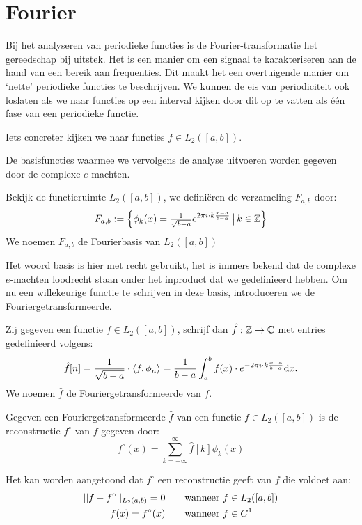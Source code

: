 \chapter{Fourier}
\label{fourierH}

Bij het analyseren van periodieke functies is de Fourier-transformatie het gereedschap bij uitstek.
Het is een manier om een signaal te karakteriseren aan de hand van een bereik aan frequenties.
Dit maakt het een overtuigende manier om `nette' periodieke functies te beschrijven.
We kunnen de eis van periodiciteit ook loslaten als we naar functies op een interval kijken door dit op te vatten
als \'e\'en fase van een periodieke functie.

Iets concreter kijken we naar functies $f\in L_2([a,b])$.


De basisfuncties waarmee we vervolgens de analyse uitvoeren worden gegeven door de complexe $e$-machten.
\begin{definitie}[Fourierbasis] Bekijk de functieruimte $L_2([a,b])$, we defini\"eren de verzameling $F_{a,b}$ 
door:
\[
  F_{a,b} := \left\{ \phi_k(x) = \tfrac{1}{\sqrt{b-a}} e^{{2\pi i} \cdot k \frac{x-a}{b-a}} \,\big|\, k \in \mathbb{Z} \right\}
\]
We noemen $F_{a,b}$ de Fourierbasis van $L_2([a,b])$
\end{definitie}
Het woord basis is hier met recht gebruikt, het is immers bekend dat de complexe $e$-machten loodrecht staan onder
het inproduct dat we gedefinieerd hebben. Om nu een willekeurige functie te schrijven in deze basis, introduceren
we de Fouriergetransformeerde.
\begin{definitie}[Fouriergetransformeerde]
Zij gegeven een functie $f\in L_2([a,b])$, schrijf dan $\hat f : \mathbb{Z}\to\mathbb{C}$ met entries gedefinieerd volgens:
\[
  \hat f [n] = \frac{1}{\sqrt{b-a}} \cdot \langle f , \phi_n \rangle = \frac{1}{b-a} \int_a^b f(x) \cdot e^{-2 \pi i \cdot k \frac{x-a}{b-a}}{\mathrm{d} x}.
\]
We noemen $\hat f$ de Fouriergetransformeerde van $f$.
\end{definitie}
\begin{definitie}
  Gegeven een Fouriergetransformeerde $\hat f$ van een functie $f \in L_2([a,b])$ is de reconstructie $f^\circ$ van $f$ gegeven door:
  \[
    f^\circ (x) = \sum_{k=-\infty}^\infty \hat f [k] \phi_k(x)
  \]
\end{definitie}

Het kan worden aangetoond dat $f^\circ$ een reconstructie geeft van $f$ die voldoet aan: \cite{fourier-rec} 
\begin{eqnarray}
  {||f-f^\circ||_{L_2(a,b)}}=0 \quad\quad \text{wanneer }& f\in L_2([a,b]) \\
  f(x) = f^\circ(x) \quad\quad \text{wanneer }& f \in C^1 
\end{eqnarray}

